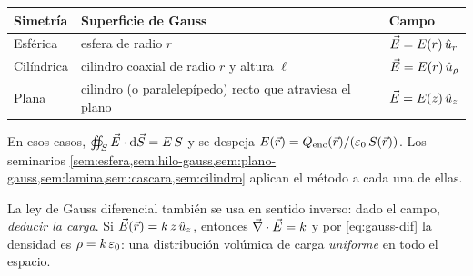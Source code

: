\begin{center}\small
\renewcommand{\arraystretch}{1.3}
\begin{tabular}{@{}lll@{}}
\toprule
Simetría & Superficie de Gauss & Campo\\
\midrule
Esférica & esfera de radio $r$ & $\vec{E}=E(r)\,\hat{u}_{r}$\\
Cilíndrica & cilindro coaxial de radio $r$ y altura $\ell$ & $\vec{E}=E(r)\,\hat{u}_{\rho}$\\
Plana & cilindro (o paralelepípedo) recto que atraviesa el plano & $\vec{E}=E(z)\,\hat{u}_{z}$\\
\bottomrule
\end{tabular}
\end{center}

En esos casos, $\oiint_{S}\vec{E}\cdot\mathrm{d}\vec{S}=E\,S$ y se despeja $E(\vec{r})=Q_{\mathrm{enc}}(\vec{r})/(\varepsilon_{0}\,S(\vec{r}))$. Los seminarios
\cref{sem:esfera,sem:hilo-gauss,sem:plano-gauss,sem:lamina,sem:cascara,sem:cilindro} aplican el método a cada una de ellas.

\begin{ejemplo}\label{ej:inverso}
La ley de Gauss diferencial también se usa en sentido inverso: dado el campo, \emph{deducir la carga}. Si $\vec{E}(\vec{r})=k\,z\,\hat{u}_{z}$,
entonces $\vec{\nabla}\cdot\vec{E}=k$ y por \cref{eq:gauss-dif} la densidad es $\rho=k\,\varepsilon_{0}$: una distribución volúmica de carga \emph{uniforme} en todo el espacio.
\end{ejemplo}
